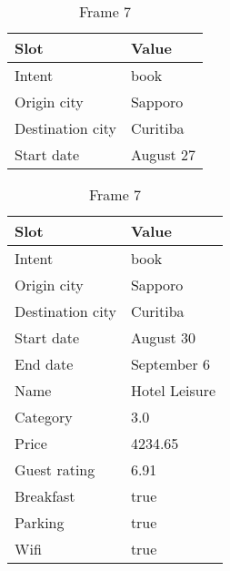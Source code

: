\begin{table}
    \vspace{\baselineskip}
    \begin{subtable}[t]{0.48\textwidth}
        \centering
        \caption{Frame 6}
        \begin{tabular}[t]{ll}
            \toprule
            Slot & Value \\
            \midrule
            Intent & book \\
            Origin city & Sapporo \\
            Destination city & Curitiba \\
            Start date & August 27 \\
            \bottomrule
        \end{tabular}
    \end{subtable}
    \begin{subtable}[t]{0.48\textwidth}
        \centering
        \caption{Frame 7}
        \begin{tabular}[t]{ll}
            \toprule
            Slot & Value \\
            \midrule
            Intent & book \\
            Origin city & Sapporo \\
            Destination city & Curitiba \\
            Start date & August 30 \\
            End date & September 6 \\
            Name & Hotel Leisure \\
            Category & 3.0 \\
            Price & 4234.65 \\
            Guest rating & 6.91 \\
            Breakfast & true \\
            Parking & true \\
            Wifi & true \\
            \bottomrule
        \end{tabular}
    \end{subtable}
\end{table}




